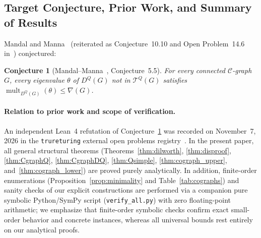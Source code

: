 \documentclass[11pt,a4paper]{article}
\newtheorem{conjecture}[theorem]{Conjecture}
\theoremstyle{definition}
\DeclareMathOperator{\mult}{mult}
\begin{document}
\subsection{Target Conjecture, Prior Work, and Summary of Results}

Mandal and Manna~\cite[Conjecture~5.5]{MM2026} (reiterated as Conjecture~10.10 and Open Problem~14.6 in~\cite{MMT2026}) conjectured:

\begin{conjecture}[Mandal--Manna~\cite{MM2026}, Conjecture~5.5]\label{conj:MM}
  For every connected $\mathcal{C}$-graph $G$, every eigenvalue $\theta$ of $D^Q(G)$ not in $\mathcal{T}^Q(G)$ satisfies $\mult_{D^Q(G)}(\theta) \le \nabla(G)$.
\end{conjecture}

\paragraph{Relation to prior work and scope of verification.}
An independent Lean~4 refutation of Conjecture~\ref{conj:MM} was recorded on November~7, 2026 in the \texttt{trureturing} external open problems registry~\cite{TrureTuring2026}. In the present paper, all general structural theorems (Theorems~\ref{thm:dilworth}, \ref{thm:disproof}, \ref{thm:CgraphQ}, \ref{thm:CgraphDQ}, \ref{thm:Qsimple}, \ref{thm:cograph_upper}, and~\ref{thm:cograph_lower}) are proved purely analytically. In addition, finite-order enumerations (Proposition~\ref{prop:minimality} and Table~\ref{tab:cographs}) and sanity checks of our explicit constructions are performed via a companion pure symbolic Python/SymPy script (\texttt{verify\_all.py}) with zero floating-point arithmetic; we emphasize that finite-order symbolic checks confirm exact small-order behavior and concrete instances, whereas all universal bounds rest entirely on our analytical proofs.
\end{document}
